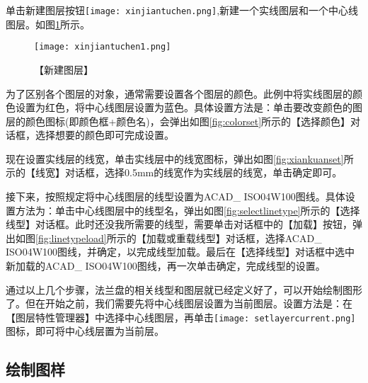 单击新建图层按钮\texttt{[image: xinjiantuchen.png]},新建一个实线图层和一个中心线图层。如图\ref{fig:xinjiantuchen}所示。
\begin{figure}[htbp]
\centering
\texttt{[image: xinjiantuchen1.png]}
\caption{【新建图层】}\label{fig:xinjiantuchen}
\end{figure}

为了区别各个图层的对象，通常需要设置各个图层的颜色。此例中将实线图层的颜色设置为红色，将中心线图层设置为蓝色。具体设置方法是：单击要改变颜色的图层的颜色图标(即颜色框+颜色名)，会弹出如图\ref{fig:colorset}所示的【选择颜色】对话框，选择想要的颜色即可完成设置。

\begin{figure}[htbp]
\centering
\begin{floatrow}
\end{floatrow}
\end{figure}
现在设置实线层的线宽，单击实线层中的线宽图标，弹出如图\ref{fig:xiankuanset}所示的【线宽】对话框，选择0.5mm的线宽作为实线层的线宽，单击确定即可。

接下来，按照规定将中心线图层的线型设置为ACAD\_ ISO04W100图线。具体设置方法为：单击中心线图层中的线型名，弹出如图\ref{fig:selectlinetype}所示的【选择线型】对话框。此时还没我所需要的线型，需要单击对话框中的【加载】按钮，弹出如图\ref{fig:linetypeload}所示的【加载或重载线型】对话框，选择ACAD\_ ISO04W100图线，并确定，以完成线型加载。最后在【选择线型】对话框中选中新加载的ACAD\_ ISO04W100图线，再一次单击确定，完成线型的设置。
\begin{figure}[htbp]
\centering
\begin{floatrow}
\end{floatrow}
\end{figure}

通过以上几个步骤，法兰盘的相关线型和图层就已经定义好了，可以开始绘制图形了。但在开始之前，我们需要先将中心线图层设置为当前图层。设置方法是：在【图层特性管理器】中选择中心线图层，再单击\texttt{[image: setlayercurrent.png]}图标，即可将中心线层置为当前层。
\subsection{绘制图样}

